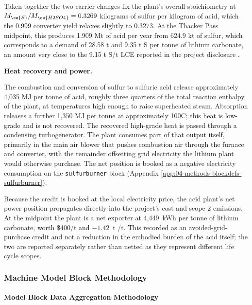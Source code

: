 \documentclass{article}
\renewcommand\_{\textunderscore\allowbreak}
\begin{document}
Taken together the two carrier changes fix the plant's overall stoichiometry at $M_{\ce{S}}/M_{\ce{H2SO4}} = 0.3269$ kilograms of sulfur per kilogram of acid, which the 0.999 converter yield relaxes slightly to 0.3273. At the Thacker Pass midpoint, this produces 1.909 Mt of acid per year from 624.9 kt of sulfur, which corresponds to a demand of 28.58 t  and 9.35 t S per tonne of lithium carbonate, an amount very close to the 9.15 t S/t LCE reported in the project disclosure \cite{sgscanadaincSK1300Technical2024}. 

\medskip
\noindent\textbf{Heat recovery and power.}\quad
 
The combustion and conversion of sulfur to sulfuric acid release approximately 4,035 MJ per tonne of acid, roughly three quarters of the total reaction enthalpy of the plant, at temperatures high enough to raise superheated steam. Absorption releases a further 1,350 MJ per tonne at approximately 100\textdegree C; this heat is low-grade and is not recovered. The recovered high-grade heat is passed through a condensing turbogenerator. The plant consumes part of that output itself, primarily in the main air blower that pushes combustion air through the furnace and converter, with the remainder offsetting grid electricity the lithium plant would otherwise purchase. The net position is booked as a negative electricity consumption on the \texttt{sulfur\_burner} block (Appendix \ref{app:04-methods-blockdefs-sulfurburner}).
 
Because the credit is booked at the local electricity price, the acid plant's net power position propagates directly into the project's cost and scope 2 emissions. At the midpoint the plant is a net exporter at 4,449~kWh per tonne of lithium carbonate, worth \$400/t  and $-1.42$~t /t. This recorded as an avoided-grid-purchase credit and not a reduction in the embodied burden of the acid itself; the two are reported separately rather than netted as they represent different life cycle scopes. 

\clearpage
\subsubsection{Machine Model Block Methodology}\label{app:04-methods-machineblocks}

\paragraph{Model Block Data Aggregation Methodology}\label{app:04-methods-machineblocks-aggregation}\leavevmode\par
\end{document}
